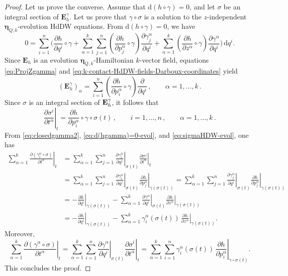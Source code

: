 \documentclass[10pt,a4paper]{amsart}
\newcommand{\dd}{\mathrm{d}}
\newcommand\restr[2]{\left.#1\right|_{#2}} \newcommand{\bfX}{\mathbf{X}} \newcommand{\bfY}{\mathbf{Y}} \newcommand{\bfZ}{\mathbf{Z}} \newcommand{\qeddiamond}{\hfill $\diamond$} \newcommand{\parder}[2]{\frac{\partial #1}{\partial #2}} \newcommand{\dparder}[2]{\dfrac{\partial #1}{\partial #2}} \newcommand{\tparder}[2]{\partial #1/\partial #2} \newcommand{\parderr}[3]{\frac{\partial^2 #1}{\partial #2\partial #3}} \newcommand{\dparderr}[3]{\dfrac{\partial^2 #1}{\partial #2\partial #3}} \newcommand{\tparderr}[3]{\partial^2 #1/\partial #2\partial #3}
\begin{document}
\begin{proof}
Let us prove the converse. Assume that $\dd (h \circ \gamma) = 0$, and let $\sigma$ be an integral section of $\mathbf E_h^\gamma$. Let us prove that $\gamma \circ \sigma$ is a solution to the $z$-independent ${\bm \eta}_{Q,k}$-evolution HdDW equations. From $\dd(h\circ \gamma)=0$, we have
\begin{equation}
\label{eq:d(hgamma)=0-evol}
0
=
\sum_{i=1}^n
\Bigg(
  \frac{\partial h}{\partial q^i} \circ \gamma
  + \sum_{\alpha=1}^k \sum_{j=1}^n
    \left(\frac{\partial h}{\partial p^\alpha_j} \circ \gamma \right)
    \frac{\partial \gamma^\alpha_j}{\partial q^i}
  + \sum_{\alpha=1}^k
    \left(\frac{\partial h}{\partial z^\alpha} \circ \gamma \right)
    \frac{\partial \gamma^\alpha}{\partial q^i}
\Bigg)
\, \dd q^i.
\end{equation}
Since $\mathbf E_h$ is an evolution ${\bm \eta}_{Q,k}$-Hamiltonian $k$-vector field, equations \eqref{eq:ProjZgamma} and \eqref{eq:k-contact-HdDW-fields-Darboux-coordinates} yield
\[
(\mathbf E_h^\gamma)_\alpha
=
\sum_{i=1}^n
\left(
  \frac{\partial h}{\partial p_i^\alpha}
  \circ \gamma
\right)
\frac{\partial}{\partial q^i}\,,
\qquad \alpha=1,\dotsc,k\,.
\]
Since $\sigma$ is an integral section of ${\bf E}_h^\gamma$, it follows that
\begin{equation}
\label{eq:sigmaHDW-evol}
\restr{\frac{\partial \sigma^i}{\partial t^\alpha}}{t} = \frac{\partial h}{\partial p_i^\alpha}\circ \gamma \circ \sigma(t)\,,\qquad i=1,\dotsc,n\,,\qquad \alpha=1,\dotsc,k\,.
\end{equation}
From \eqref{eq:closedgamma2}, \eqref{eq:d(hgamma)=0-evol}, and \eqref{eq:sigmaHDW-evol}, one has
\begin{align}
\sum_{\alpha=1}^k
\restr{\frac{\partial(\gamma_i^\alpha \circ \sigma)}{\partial t^\alpha}}{t}
&=
\sum_{\alpha=1}^k \sum_{j=1}^n
\restr{\frac{\partial \gamma_i^\alpha}{\partial q^j}}{\sigma(t)}
\restr{\frac{\partial \sigma^j}{\partial t^\alpha}}{t}
\\
&=
\sum_{\alpha=1}^k \sum_{j=1}^n
\restr{\frac{\partial \gamma_i^\alpha}{\partial q^j}}{\sigma(t)}
\restr{\frac{\partial h}{\partial p_j^\alpha}}{\gamma(\sigma(t))}
=
\sum_{\alpha=1}^k \sum_{j=1}^n
\restr{\frac{\partial \gamma_j^\alpha}{\partial q^i}}{\sigma(t)}
\restr{\frac{\partial h}{\partial p_j^\alpha}}{\gamma(\sigma(t))}
\\
&=
- \restr{\frac{\partial h}{\partial q^i}}{\gamma(\sigma(t))}
-
\sum_{\alpha=1}^k
\restr{\frac{\partial \gamma^\alpha}{\partial q^i}}{\sigma(t)}
\restr{\frac{\partial h}{\partial z^\alpha}}{\gamma(\sigma(t))}
\\
&=
- \restr{\frac{\partial h}{\partial q^i}}{\gamma(\sigma(t))}
-
\sum_{\alpha=1}^k
\gamma_i^\alpha (\sigma(t))\,
\restr{\frac{\partial h}{\partial z^\alpha}}{\gamma(\sigma(t))}.
\end{align}
Moreover,
\[
\sum_{\alpha=1}^k
\restr{\frac{\partial (\gamma^\alpha \circ \sigma)}{\partial t^\alpha}}{t}
=
\sum_{\alpha=1}^k \sum_{i=1}^n
\restr{\frac{\partial \gamma^\alpha}{\partial q^i}}{\sigma(t)}
\restr{\frac{\partial \sigma^i}{\partial t^\alpha}}{t}
=
\sum_{\alpha=1}^k \sum_{i=1}^n
\gamma^\alpha_i(\sigma(t))\,
\restr{\frac{\partial h}{\partial p_i^\alpha}}{\gamma\circ\sigma(t)}.
\]
This concludes the proof.
\end{proof}
\end{document}
